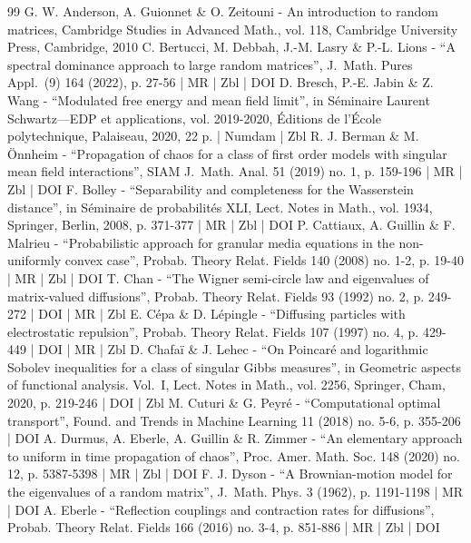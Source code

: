 \begin{thebibliography}{99}
G. W. Anderson, A. Guionnet \& O. Zeitouni - An introduction to random matrices, Cambridge Studies in Advanced Math., vol. 118, Cambridge University Press, Cambridge, 2010
C. Bertucci, M. Debbah, J.-M. Lasry \& P.-L. Lions - “A spectral dominance approach to large random matrices”, J. Math. Pures Appl. (9) 164 (2022), p. 27-56 | MR | Zbl | DOI
D. Bresch, P.-E. Jabin \& Z. Wang - “Modulated free energy and mean field limit”, in Séminaire Laurent Schwartz—EDP et applications, vol. 2019-2020, Éditions de l’École polytechnique, Palaiseau, 2020, 22 p. | Numdam | Zbl
R. J. Berman \& M. Önnheim - “Propagation of chaos for a class of first order models with singular mean field interactions”, SIAM J. Math. Anal. 51 (2019) no. 1, p. 159-196 | MR | Zbl | DOI
F. Bolley - “Separability and completeness for the Wasserstein distance”, in Séminaire de probabilités XLI, Lect. Notes in Math., vol. 1934, Springer, Berlin, 2008, p. 371-377 | MR | Zbl | DOI
P. Cattiaux, A. Guillin \& F. Malrieu - “Probabilistic approach for granular media equations in the non-uniformly convex case”, Probab. Theory Relat. Fields 140 (2008) no. 1-2, p. 19-40 | MR | Zbl | DOI
T. Chan - “The Wigner semi-circle law and eigenvalues of matrix-valued diffusions”, Probab. Theory Relat. Fields 93 (1992) no. 2, p. 249-272 | DOI | MR | Zbl
E. Cépa \& D. Lépingle - “Diffusing particles with electrostatic repulsion”, Probab. Theory Relat. Fields 107 (1997) no. 4, p. 429-449 | DOI | MR | Zbl
D. Chafaï \& J. Lehec - “On Poincaré and logarithmic Sobolev inequalities for a class of singular Gibbs measures”, in Geometric aspects of functional analysis. Vol. I, Lect. Notes in Math., vol. 2256, Springer, Cham, 2020, p. 219-246 | DOI | Zbl
M. Cuturi \& G. Peyré - “Computational optimal transport”, Found. and Trends in Machine Learning 11 (2018) no. 5-6, p. 355-206 | DOI
A. Durmus, A. Eberle, A. Guillin \& R. Zimmer - “An elementary approach to uniform in time propagation of chaos”, Proc. Amer. Math. Soc. 148 (2020) no. 12, p. 5387-5398 | MR | Zbl | DOI
F. J. Dyson - “A Brownian-motion model for the eigenvalues of a random matrix”, J. Math. Phys. 3 (1962), p. 1191-1198 | MR | DOI
A. Eberle - “Reflection couplings and contraction rates for diffusions”, Probab. Theory Relat. Fields 166 (2016) no. 3-4, p. 851-886 | MR | Zbl | DOI

\end{thebibliography}
